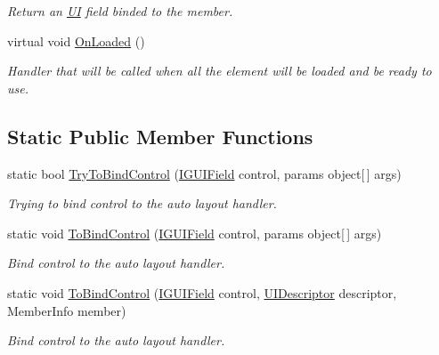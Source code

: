 \begin{DoxyCompactItemize}
\begin{DoxyCompactList}\small\item\em Return an \mbox{\hyperlink{namespace_wpf_handler_1_1_u_i}{UI}} field binded to the member. \end{DoxyCompactList}\item 
virtual void \mbox{\hyperlink{class_wpf_handler_1_1_u_i_1_1_auto_layout_1_1_u_i_descriptor_a6dbda96f0d1b9f65fd1c61e0b8a5bb6b}{On\+Loaded}} ()
\begin{DoxyCompactList}\small\item\em Handler that will be called when all the element will be loaded and be ready to use. \end{DoxyCompactList}\end{DoxyCompactItemize}
\subsection*{Static Public Member Functions}
\begin{DoxyCompactItemize}
\item 
static bool \mbox{\hyperlink{class_wpf_handler_1_1_u_i_1_1_auto_layout_1_1_u_i_descriptor_a51be997d431bb7a6d73de302f60f6dd9}{Try\+To\+Bind\+Control}} (\mbox{\hyperlink{interface_wpf_handler_1_1_u_i_1_1_auto_layout_1_1_i_g_u_i_field}{I\+G\+U\+I\+Field}} control, params object\mbox{[}$\,$\mbox{]} args)
\begin{DoxyCompactList}\small\item\em Trying to bind control to the auto layout handler. \end{DoxyCompactList}\item 
static void \mbox{\hyperlink{class_wpf_handler_1_1_u_i_1_1_auto_layout_1_1_u_i_descriptor_a129506a55a400487664febab7ea85266}{To\+Bind\+Control}} (\mbox{\hyperlink{interface_wpf_handler_1_1_u_i_1_1_auto_layout_1_1_i_g_u_i_field}{I\+G\+U\+I\+Field}} control, params object\mbox{[}$\,$\mbox{]} args)
\begin{DoxyCompactList}\small\item\em Bind control to the auto layout handler. \end{DoxyCompactList}\item 
static void \mbox{\hyperlink{class_wpf_handler_1_1_u_i_1_1_auto_layout_1_1_u_i_descriptor_a763e1f50836b07edf0a3e6579454c335}{To\+Bind\+Control}} (\mbox{\hyperlink{interface_wpf_handler_1_1_u_i_1_1_auto_layout_1_1_i_g_u_i_field}{I\+G\+U\+I\+Field}} control, \mbox{\hyperlink{class_wpf_handler_1_1_u_i_1_1_auto_layout_1_1_u_i_descriptor}{U\+I\+Descriptor}} descriptor, Member\+Info member)
\begin{DoxyCompactList}\small\item\em Bind control to the auto layout handler. \end{DoxyCompactList}\end{DoxyCompactItemize}
